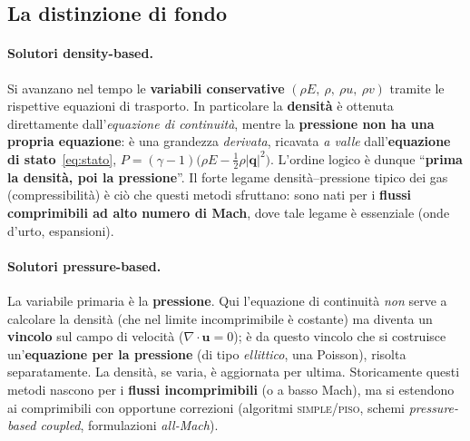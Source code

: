 \subsection{La distinzione di fondo}
\label{sub:distinzione_paradigmi}

\paragraph{Solutori density-based.} Si avanzano nel tempo le \textbf{variabili
conservative} $(\rho E,\ \rho,\ \rho u,\ \rho v)$ tramite le rispettive equazioni di
trasporto. In particolare la \textbf{densità} è ottenuta direttamente
dall'\emph{equazione di continuità}, mentre la \textbf{pressione non ha una propria
equazione}: è una grandezza \emph{derivata}, ricavata \emph{a valle}
dall'\textbf{equazione di stato}~\eqref{eq:stato},
$P = (\gamma-1)\big(\rho E - \tfrac12\rho|\bm q|^2\big)$. L'ordine logico è dunque
``\textbf{prima la densità, poi la pressione}''. Il forte legame densità--pressione
tipico dei gas (compressibilità) è ciò che questi metodi sfruttano: sono nati per i
\textbf{flussi comprimibili ad alto numero di Mach}, dove tale legame è
essenziale (onde d'urto, espansioni).

\paragraph{Solutori pressure-based.} La variabile primaria è la \textbf{pressione}.
Qui l'equazione di continuità \emph{non} serve a calcolare la densità (che nel limite
incomprimibile è costante) ma diventa un \textbf{vincolo} sul campo di velocità
($\nabla\cdot\bm u = 0$); è da questo vincolo che si costruisce un'\textbf{equazione
per la pressione} (di tipo \emph{ellittico}, una Poisson), risolta separatamente. La
densità, se varia, è aggiornata per ultima. Storicamente questi metodi nascono per i
\textbf{flussi incomprimibili} (o a basso Mach), ma si estendono ai comprimibili con
opportune correzioni (algoritmi \textsc{simple}/\textsc{piso}, schemi
\emph{pressure-based coupled}, formulazioni \emph{all-Mach}).

